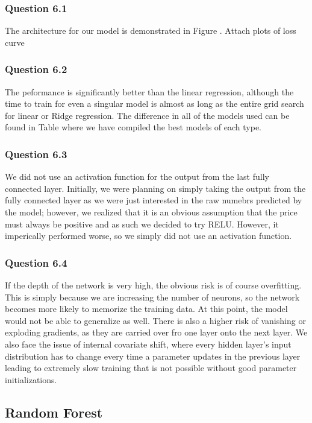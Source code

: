 \documentclass[11pt,letterpaper]{article}
\begin{document}
\subsubsection*{Question 6.1}
The architecture for our model is demonstrated in Figure . Attach plots of loss curve
\subsubsection*{Question 6.2}
The peformance is significantly better than the linear regression, although the time to train for even a singular 
model is almost as long as the entire grid search for linear or Ridge regression. The difference in all of the models
used can be found in Table where we have compiled the best models of each type. 
\subsubsection*{Question 6.3}
We did not use an activation function for the output from the last fully connected layer. Initially, we were planning on 
simply taking the output from the fully connected layer as we were just interested in the raw numebrs predicted by 
the model; however, we realized that it is an obvious assumption that the price must always be positive and as such
we decided to try RELU. However, it imperically performed worse, so we simply did not use an activation function. 
\subsubsection*{Question 6.4}
If the depth of the network is very high, the obvious risk is of course overfitting. This is simply because we are
increasing the number of neurons, so the network becomes more likely to memorize the training data. At this point,
the model would not be able to generalize as well. There is also a higher risk of vanishing or exploding gradients,
as they are carried over fro one layer onto the next layer. We also face the issue of internal covariate shift, 
where every hidden layer's input distribution has to change every time a parameter updates in the previous layer 
leading to extremely slow training that is not possible without good parameter initializations. 
\subsection*{Random Forest}
\end{document}
